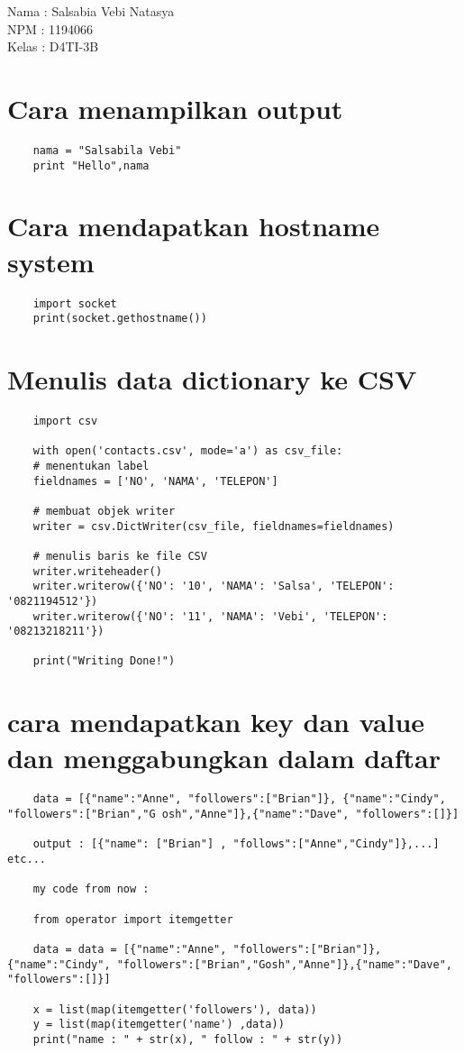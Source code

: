 \documentclass[12pt]{article} %
\begin{document}
Nama	: Salsabia Vebi Natasya \\
NPM		: 1194066 \\
Kelas	: D4TI-3B \\
	
\section{Cara menampilkan output}
\begin{lstlisting}
	nama = "Salsabila Vebi"
	print "Hello",nama
\end{lstlisting}
	
\section {Cara mendapatkan hostname system}
\begin{lstlisting}
	import socket
	print(socket.gethostname())
\end{lstlisting}
	
\section{ Menulis data dictionary ke CSV}
\begin{lstlisting}
	import csv
		
	with open('contacts.csv', mode='a') as csv_file:
	# menentukan label
	fieldnames = ['NO', 'NAMA', 'TELEPON']
		
	# membuat objek writer
	writer = csv.DictWriter(csv_file, fieldnames=fieldnames)
		
	# menulis baris ke file CSV
	writer.writeheader()
	writer.writerow({'NO': '10', 'NAMA': 'Salsa', 'TELEPON': '0821194512'})
	writer.writerow({'NO': '11', 'NAMA': 'Vebi', 'TELEPON': '08213218211'})
		
	print("Writing Done!")
\end{lstlisting}
	
	
\section{cara mendapatkan key dan value dan menggabungkan dalam daftar}
\begin{lstlisting}
	data = [{"name":"Anne", "followers":["Brian"]}, {"name":"Cindy", "followers":["Brian","G osh","Anne"]},{"name":"Dave", "followers":[]}]
		
	output : [{"name": ["Brian"] , "follows":["Anne","Cindy"]},...] etc...
		
	my code from now :
		
	from operator import itemgetter
		
	data = data = [{"name":"Anne", "followers":["Brian"]}, {"name":"Cindy", "followers":["Brian","Gosh","Anne"]},{"name":"Dave", "followers":[]}]
		
	x = list(map(itemgetter('followers'), data))
	y = list(map(itemgetter('name') ,data))
	print("name : " + str(x), " follow : " + str(y))
\end{lstlisting}
	
\end{document}
